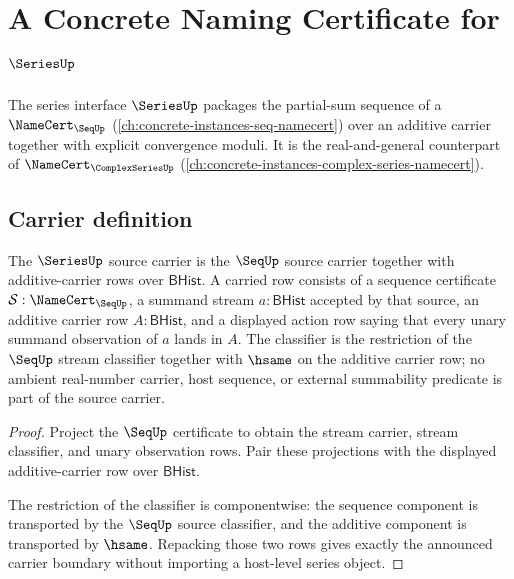 \chapter{A Concrete Naming Certificate for $\SeriesUp$}
\label{ch:concrete-instances-series-namecert}

The series interface $\SeriesUp$ packages the partial-sum sequence of a $\NameCert_{\SeqUp}$ (\autoref{ch:concrete-instances-seq-namecert}) over an additive carrier together with explicit convergence moduli. It is the real-and-general counterpart of $\NameCert_{\ComplexSeriesUp}$ (\autoref{ch:concrete-instances-complex-series-namecert}).

\section{Carrier definition}
\label{sec:series-carrier}

\begin{theorem}
\label{thm:series-source-carrier-boundary-obligation}
The $\SeriesUp$ source carrier is the $\SeqUp$ source carrier together with additive-carrier rows over $\mathsf{BHist}$. A carried row consists of a sequence certificate $\mathcal{S}:\NameCert_{\SeqUp}$, a summand stream $a:\mathsf{BHist}$ accepted by that source, an additive carrier row $A:\mathsf{BHist}$, and a displayed action row saying that every unary summand observation of $a$ lands in $A$. The classifier is the restriction of the $\SeqUp$ stream classifier together with $\hsame$ on the additive carrier row; no ambient real-number carrier, host sequence, or external summability predicate is part of the source carrier.
\end{theorem}
\begin{proof}
Project the $\SeqUp$ certificate to obtain the stream carrier, stream classifier, and unary observation rows. Pair these projections with the displayed additive-carrier row over $\mathsf{BHist}$.

The restriction of the classifier is componentwise: the sequence component is transported by the $\SeqUp$ source classifier, and the additive component is transported by $\hsame$. Repacking those two rows gives exactly the announced carrier boundary without importing a host-level series object.
\end{proof}

